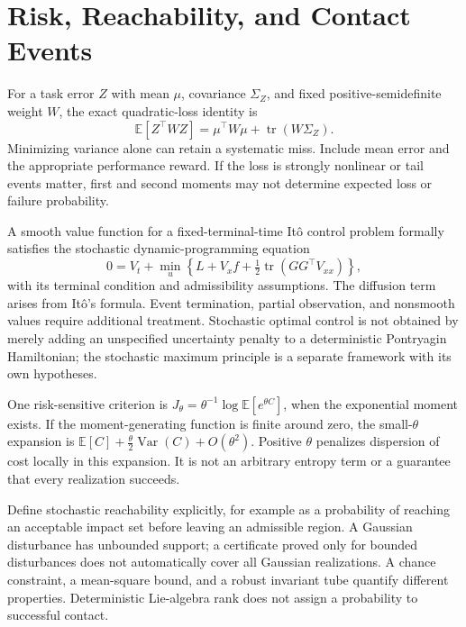 \documentclass[12pt, openany]{book}
\theoremstyle{plain}
\begin{document}
\section{Risk, Reachability, and Contact Events}

For a task error $Z$ with mean $\mu$, covariance $\Sigma_Z$, and fixed positive-semidefinite weight $W$, the exact quadratic-loss identity is
\begin{equation}
\mathbb E[Z^\top WZ]=\mu^\top W\mu+\operatorname{tr}(W\Sigma_Z).
\end{equation}
Minimizing variance alone can retain a systematic miss. Include mean error and the appropriate performance reward. If the loss is strongly nonlinear or tail events matter, first and second moments may not determine expected loss or failure probability.

A smooth value function for a fixed-terminal-time Itô control problem formally satisfies the stochastic dynamic-programming equation
\begin{equation}
0=V_t+\min_u\left\{L+V_x f+
\tfrac12\operatorname{tr}(GG^\top V_{xx})\right\},
\end{equation}
with its terminal condition and admissibility assumptions. The diffusion term arises from Itô's formula. Event termination, partial observation, and nonsmooth values require additional treatment. Stochastic optimal control is not obtained by merely adding an unspecified uncertainty penalty to a deterministic Pontryagin Hamiltonian; the stochastic maximum principle is a separate framework with its own hypotheses.

One risk-sensitive criterion is $J_\theta=\theta^{-1}\log\mathbb E[e^{\theta C}]$, when the exponential moment exists. If the moment-generating function is finite around zero, the small-$\theta$ expansion is $\mathbb E[C]+\tfrac{\theta}{2}\operatorname{Var}(C)+O(\theta^2)$. Positive $\theta$ penalizes dispersion of cost locally in this expansion. It is not an arbitrary entropy term or a guarantee that every realization succeeds.

Define stochastic reachability explicitly, for example as a probability of reaching an acceptable impact set before leaving an admissible region. A Gaussian disturbance has unbounded support; a certificate proved only for bounded disturbances does not automatically cover all Gaussian realizations. A chance constraint, a mean-square bound, and a robust invariant tube quantify different properties. Deterministic Lie-algebra rank does not assign a probability to successful contact.
\end{document}

